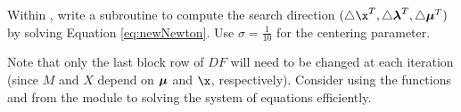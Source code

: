 \begin{problem} %
Within , write a subroutine to compute the search direction $(\triangle \x^T, \triangle \Lamb^T, \triangle \Mu^T)$ by solving Equation \ref{eq:newNewton}.
Use $\sigma = \frac{1}{10}$ for the centering parameter.

Note that only the last block row of $DF$ will need to be changed at each iteration (since $M$ and $X$ depend on $\boldsymbol{\mu}$ and $\x$, respectively).
Consider using the functions  and  from the  module to solving the system of equations efficiently.
\end{problem}

